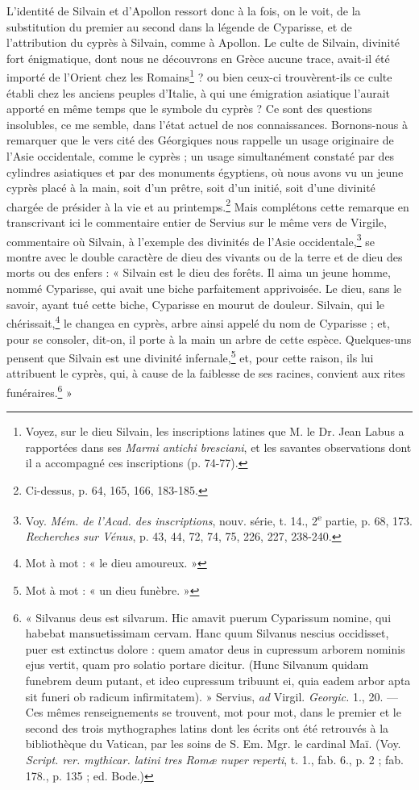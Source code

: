 \documentclass{article}
\begin{document}
L'identité de Silvain et d'Apollon ressort donc à la fois, on le voit, de la substitution du premier au second dans la légende de Cyparisse, et de l'attribution du cyprès à Silvain, comme à Apollon. Le culte de Silvain, divinité fort énigmatique, dont nous ne découvrons en Grèce aucune trace, avait-il été importé de l'Orient chez les Romains\footnote{Voyez, sur le dieu Silvain, les inscriptions latines que M. le Dr. Jean Labus a rapportées dans ses \emph{Marmi antichi bresciani}, et les savantes observations dont il a accompagné ces inscriptions (p. 74-77).} ? ou bien ceux-ci trouvèrent-ils ce culte établi chez les anciens peuples d'Italie, à qui une émigration asiatique l'aurait apporté en même temps que le symbole du cyprès ? Ce sont des questions insolubles, ce me semble, dans l'état actuel de nos connaissances. Bornons-nous à remarquer que le vers cité des Géorgiques nous rappelle un usage originaire de l'Asie occidentale, comme le cyprès ; un usage simultanément constaté par des cylindres asiatiques et par des monuments égyptiens, où nous avons vu un jeune cyprès placé à la main, soit d'un prêtre, soit d'un initié, soit d'une divinité chargée de présider à la vie et au printemps.\footnote{Ci-dessus, p. 64, 165, 166, 183-185.} Mais complétons cette remarque en transcrivant ici le commentaire entier de Servius sur le même vers de Virgile, commentaire où Silvain, à l'exemple des divinités de l'Asie occidentale,\footnote{Voy. \emph{Mém. de l'Acad. des inscriptions}, nouv. série, t. 14., 2\textsuperscript{e} partie, p. 68, 173. \emph{Recherches sur Vénus}, p. 43, 44, 72, 74, 75, 226, 227, 238-240.} se montre avec le double caractère de dieu des vivants ou de la terre et de dieu des morts ou des enfers : « Silvain est le dieu des forêts. Il aima un jeune homme, nommé Cyparisse, qui avait une biche parfaitement apprivoisée. Le dieu, sans le savoir, ayant tué cette biche, Cyparisse en mourut de douleur. Silvain, qui le chérissait,\footnote{Mot à mot : « le dieu amoureux. »} le changea en cyprès, arbre ainsi appelé du nom de Cyparisse ; et, pour se consoler, dit-on, il porte à la main un arbre de cette espèce. Quelques-uns pensent que Silvain est une divinité infernale,\footnote{Mot à mot : « un dieu funèbre. »} et, pour cette raison, ils lui attribuent le cyprès, qui, à cause de la faiblesse de ses racines, convient aux rites funéraires.\footnote{« Silvanus deus est silvarum. Hic amavit puerum Cyparissum nomine, qui habebat mansuetissimam cervam. Hanc quum Silvanus nescius occidisset, puer est extinctus dolore : quem amator deus in cupressum arborem nominis ejus vertit, quam pro solatio portare dicitur. (Hunc Silvanum quidam funebrem deum putant, et ideo cupressum tribuunt ei, quia eadem arbor apta sit funeri ob radicum infirmitatem). » Servius, \emph{ad} Virgil. \emph{Georgic.} 1., 20. --- Ces mêmes renseignements se trouvent, mot pour mot, dans le premier et le second des trois mythographes latins dont les écrits ont été retrouvés à la bibliothèque du Vatican, par les soins de S. Em. Mgr. le cardinal Maï. (Voy. \emph{Script. rer. mythicar. latini tres Romæ nuper reperti}, t. 1., fab. 6., p. 2 ; fab. 178., p. 135 ; ed. Bode.)} »
\end{document}
